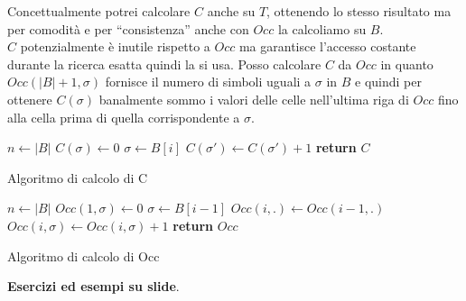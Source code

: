\documentclass[a4paper,12pt, oneside]{book}
\begin{document}
Concettualmente potrei calcolare $C$ anche su $T$, ottenendo lo stesso risultato
ma per comodità e per ``consistenza'' anche con $Occ$ la calcoliamo su $B$.\\
$C$ potenzialmente è inutile rispetto a $Occ$ ma garantisce l'accesso costante
durante la ricerca esatta quindi la si usa. Posso calcolare $C$ da $Occ$ in
quanto $Occ(|B|+1,\sigma)$ fornisce il numero di simboli uguali a $\sigma$ in
$B$ e quindi per ottenere $C(\sigma)$ banalmente sommo i valori delle celle
nell'ultima riga di $Occ$ fino alla cella prima di quella corrispondente a
$\sigma$. 
\begin{algorithm}
  \begin{algorithmic}
    \State $n\gets |B|$
    \State $C(\sigma)\gets 0$
    \EndFor
    \State $\sigma\gets B[i]$
    \State $C(\sigma')\gets C(\sigma')+1$
    \EndFor
    \EndFor
    \State \textbf{return} $C$
    \EndFunction
  \end{algorithmic}
  \caption{Algoritmo di calcolo di C}
\end{algorithm}
\begin{algorithm}
  \begin{algorithmic}
    \State $n\gets |B|$
    \State $Occ(1,\sigma)\gets 0$
    \EndFor
    \State $\sigma\gets B[i-1]$
    \State $Occ(i,.)\gets Occ(i-1,.)$
    \State $Occ(i,\sigma)\gets Occ(i,\sigma)+1$
    \EndFor
    \State \textbf{return} $Occ$
    \EndFunction
  \end{algorithmic}
  \caption{Algoritmo di calcolo di Occ}
\end{algorithm}
\textbf{Esercizi ed esempi su slide}.\\
\end{document}
